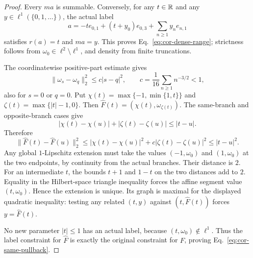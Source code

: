 \begin{proof}
Every $ma$ is summable. Conversely, for any $t\in\mathbb R$ and any
$y\in\ell^1(\{0,1,\ldots\})$, the actual label
\[
a=-t e_{0,1}+(t+y_0)e_{0,3}+\sum_{n\ge1}y_n e_{n,1}
\]
satisfies $r(a)=t$ and $ma=y$. This proves
Eq.~\eqref{eq:cor-dense-range}; strictness follows from
$\omega_0\in\ell^2\setminus\ell^1$, and density from finite truncations.

The coordinatewise positive-part estimate gives
\[
\|\omega_s-\omega_q\|_2^2\le c|s-q|^2,\qquad
c=\frac1{16}\sum_{n\ge1}n^{-3/2}<1,
\]
also for $s=0$ or $q=0$. Put $\chi(t)=\max\{-1,\min\{1,t\}\}$ and
$\zeta(t)=\max\{|t|-1,0\}$. Then
$\widehat F(t)=(\chi(t),\omega_{\zeta(t)})$.
The same-branch and opposite-branch cases give
\[
|\chi(t)-\chi(u)|+|\zeta(t)-\zeta(u)|\le|t-u|.
\]
Therefore
\[
\|\widehat F(t)-\widehat F(u)\|_2^2
\le|\chi(t)-\chi(u)|^2+c|\zeta(t)-\zeta(u)|^2
\le|t-u|^2.
\]
Any global $1$-Lipschitz extension must take the values
$(-1,\omega_0)$ and $(1,\omega_0)$ at the two endpoints, by
continuity from the actual branches. Their distance is $2$.
For an intermediate $t$, the bounds $t+1$ and $1-t$ on the two
distances add to $2$. Equality in the Hilbert-space triangle inequality
forces the affine segment value $(t,\omega_0)$. Hence the extension
is unique. Its graph is maximal for the displayed quadratic inequality:
testing any related $(t,y)$ against $(t,\widehat F(t))$ forces
$y=\widehat F(t)$.

No new parameter $|t|\le1$ has an actual label, because
$(t,\omega_0)\notin\ell^1$. Thus the label constraint for
$\widehat F$ is exactly the original constraint for $F$, proving
Eq.~\eqref{eq:cor-same-pullback}.


\end{proof}
